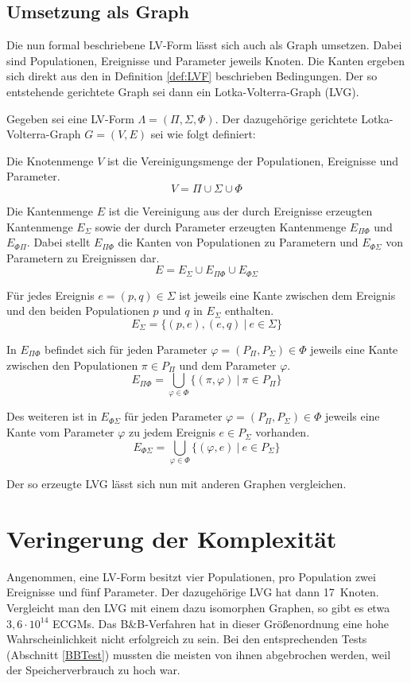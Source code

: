 \subsection{Umsetzung als Graph}
Die nun formal beschriebene LV-Form lässt sich auch als Graph umsetzen. Dabei 
sind Populationen, Ereignisse und Parameter jeweils Knoten. Die Kanten ergeben 
sich direkt aus den in Definition \ref{def:LVF} beschrieben Bedingungen. Der 
so entstehende gerichtete Graph sei dann ein Lotka-Volterra-Graph (LVG).

\begin{mydef}
Gegeben sei eine LV-Form $\Lambda=(\Pi, \Sigma, \Phi)$. Der dazugehörige 
gerichtete Lotka-Volterra-Graph $G=(V,E)$ sei wie folgt definiert:

Die Knotenmenge $V$ ist die Vereinigungsmenge der Populationen, Ereignisse 
und Parameter.
\[ V=\Pi \cup \Sigma \cup \Phi \]

Die Kantenmenge $E$ ist die Vereinigung aus der durch Ereignisse erzeugten 
Kantenmenge $E_\Sigma$ sowie der durch Parameter erzeugten Kantenmenge $E_{\Pi\Phi}$ 
und $E_{\Phi\Pi}$. Dabei stellt $E_{\Pi\Phi}$ die Kanten von Populationen zu 
Parametern und $E_{\Phi\Sigma}$ von Parametern zu Ereignissen dar. 
\[ E=E_\Sigma \cup E_{\Pi\Phi} \cup E_{\Phi\Sigma} \]

Für jedes Ereignis $e=(p,q)\in\Sigma$ ist jeweils eine Kante zwischen dem Ereignis 
und den beiden Populationen $p$ und $q$ in $E_\Sigma$ enthalten. 
\[ E_\Sigma=\{(p,e),(e,q)\ |\ e \in \Sigma\} \]

In $E_{\Pi\Phi}$ befindet sich für jeden Parameter $\varphi=(P_\Pi,P_\Sigma) \in \Phi$ 
jeweils eine Kante zwischen den Populationen $\pi \in P_\Pi$ und dem Parameter $\varphi$.
\[ E_{\Pi\Phi}=\bigcup_{\varphi \in \Phi}\{(\pi,\varphi)\ |\ \pi \in P_\Pi\} \]

Des weiteren ist in $E_{\Phi\Sigma}$ für jeden Parameter $\varphi=(P_\Pi,P_\Sigma) \in \Phi$
jeweils eine Kante vom Parameter $\varphi$ zu jedem Ereignis $e \in P_\Sigma$ vorhanden.
\[ E_{\Phi\Sigma}=\bigcup_{\varphi \in \Phi}\{(\varphi,e)\ |\ e \in P_\Sigma\} \]
\end{mydef}

Der so erzeugte LVG lässt sich nun mit anderen Graphen vergleichen.

\section{Veringerung der Komplexität}
Angenommen, eine LV-Form besitzt vier Populationen, pro Population zwei Ereignisse 
und fünf Parameter. Der dazugehörige LVG hat dann 17~Knoten. Vergleicht 
man den LVG mit einem dazu isomorphen Graphen, so gibt es etwa $3{,}6 \cdot 10^{14}$ 
ECGMs. Das B\&B-Verfahren hat in dieser Größenordnung eine hohe Wahrscheinlichkeit 
nicht erfolgreich zu sein. Bei den entsprechenden Tests (Abschnitt \ref{BBTest}) 
mussten die meisten von ihnen abgebrochen werden, weil der Speicherverbrauch zu hoch war. 

